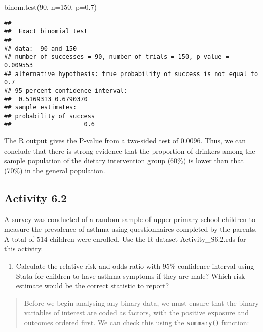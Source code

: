 \documentclass[
]{memoir}
\newenvironment{Shaded}{\begin{snugshade}}{\end{snugshade}}
\newcommand{\AttributeTok}[1]{\textcolor[rgb]{0.77,0.63,0.00}{#1}}
\newcommand{\DecValTok}[1]{\textcolor[rgb]{0.00,0.00,0.81}{#1}}
\newcommand{\FloatTok}[1]{\textcolor[rgb]{0.00,0.00,0.81}{#1}}
\newcommand{\FunctionTok}[1]{\textcolor[rgb]{0.00,0.00,0.00}{#1}}
\newcommand{\NormalTok}[1]{#1}
\providecommand{\tightlist}{%
  \setlength{\itemsep}{0pt}\setlength{\parskip}{0pt}}
\begin{document}
\begin{Shaded}
\begin{Highlighting}[]
\FunctionTok{binom.test}\NormalTok{(}\DecValTok{90}\NormalTok{, }\AttributeTok{n=}\DecValTok{150}\NormalTok{, }\AttributeTok{p=}\FloatTok{0.7}\NormalTok{)}
\end{Highlighting}
\end{Shaded}

\begin{verbatim}
## 
##  Exact binomial test
## 
## data:  90 and 150
## number of successes = 90, number of trials = 150, p-value = 0.009553
## alternative hypothesis: true probability of success is not equal to 0.7
## 95 percent confidence interval:
##  0.5169313 0.6790370
## sample estimates:
## probability of success 
##                    0.6
\end{verbatim}

The R output gives the P-value from a two-sided test of 0.0096. Thus, we can conclude that there is strong evidence that the proportion of drinkers among the sample population of the dietary intervention group (60\%) is lower than that (70\%) in the general population.

\hypertarget{activity-6.2}{%
\subsection*{Activity 6.2}\label{activity-6.2}}

A survey was conducted of a random sample of upper primary school children to measure the prevalence of asthma using questionnaires completed by the parents. A total of 514 children were enrolled. Use the R dataset Activity\_S6.2.rds for this activity.

\begin{enumerate}
\def\labelenumi{\alph{enumi})}
\tightlist
\item
  Calculate the relative risk and odds ratio with 95\% confidence interval using Stata for children to have asthma symptoms if they are male? Which risk estimate would be the correct statistic to report?
\end{enumerate}

\begin{quote}
Before we begin analysing any binary data, we must ensure that the binary variables of interest are coded as factors, with the positive exposure and outcomes ordered first. We can check this using the \texttt{summary()} function:
\end{quote}
\end{document}
